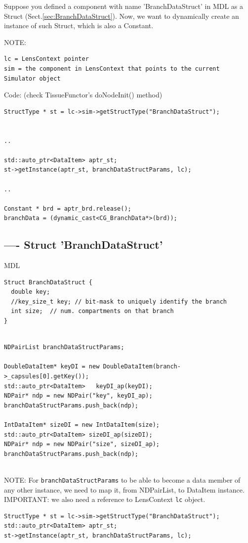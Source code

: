 Suppose you defined a component with name 'BranchDataStruct' in MDL as
a Struct (Sect.\ref{sec:BranchDataStruct}). Now, we want to dynamically create
an instance of such Struct, which is also a Constant.

NOTE:
\begin{verbatim}
lc = LensContext pointer
sim = the component in LensContext that points to the current Simulator object
\end{verbatim}

Code: (check TissueFunctor's doNodeInit() method)
\begin{verbatim}
StructType * st = lc->sim->getStructType("BranchDataStruct");


..

std::auto_ptr<DataItem> aptr_st;
st->getInstance(aptr_st, branchDataStructParams, lc);

..

Constant * brd = aptr_brd.release();
branchData = (dynamic_cast<CG_BranchData*>(brd));
\end{verbatim}

\subsection{---- Struct 'BranchDataStruct'}
\label{sec:create-struct-BranchDataStruct}

MDL
\begin{verbatim}
Struct BranchDataStruct {
  double key; 
  //key_size_t key; // bit-mask to uniquely identify the branch 
  int size;  // num. compartments on that branch
}
\end{verbatim}

\begin{lstlisting}

NDPairList branchDataStructParams;

DoubleDataItem* keyDI = new DoubleDataItem(branch->_capsules[0].getKey());
std::auto_ptr<DataItem>   keyDI_ap(keyDI);
NDPair* ndp = new NDPair("key", keyDI_ap);
branchDataStructParams.push_back(ndp);

IntDataItem* sizeDI = new IntDataItem(size); 
std::auto_ptr<DataItem> sizeDI_ap(sizeDI);
NDPair* ndp = new NDPair("size", sizeDI_ap);
branchDataStructParams.push_back(ndp);


\end{lstlisting}

NOTE: For \verb!branchDataStructParams! to be able to become a data member of
any other instance, we need to map it, from NDPairList, to DataItem instance.
IMPORTANT: we also need a reference to LensContext \verb!lc! object.
\begin{lstlisting}
StructType * st = lc->sim->getStructType("BranchDataStruct");
std::auto_ptr<DataItem> aptr_st;
st->getInstance(aptr_st, branchDataStructParams, lc);
\end{lstlisting}



